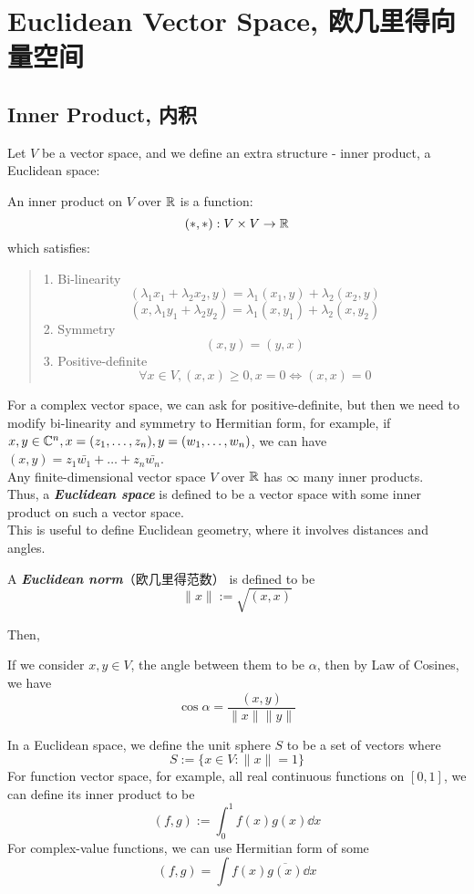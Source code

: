 \section{Euclidean Vector Space, 欧几里得向量空间}
\subsection{Inner Product, 内积}
Let $V$ be a vector space, and we define an extra structure - inner product, a Euclidean space:
\begin{definition}
    An inner product on $V$ over $\mathbb{R}$ is a function:
    $$(*, *) : V \times V \to \mathbb{R}$$
    which satisfies:
    \begin{quote}
        1. Bi-linearity
        $$(\lambda_1x_1 + \lambda_2x_2, y) = \lambda_1(x_1, y) + \lambda_2(x_2, y)$$
        $$(x, \lambda_1y_1 + \lambda_2y_2) = \lambda_1(x, y_1) + \lambda_2(x, y_2)$$
        2. Symmetry
        $$(x, y) = (y, x)$$
        3. Positive-definite
        $$\forall x \in V, (x, x) \ge 0, x = 0 \iff (x, x) = 0$$
    \end{quote}
\end{definition}
For a complex vector space, we can ask for positive-definite, but then we need to modify bi-linearity and symmetry to Hermitian form, for example, if $x, y \in \mathbb{C}^n, x = (z_1,  \dots, z_n), y = (w_1, \dots, w_n)$, we can have $(x, y) = z_1 \bar{w_1} + \dots + z_n \bar{w_n}$. \\
Any finite-dimensional vector space $V$ over $\mathbb{R}$ has $\infty$ many inner products. \\
Thus, a \textbf{\textit{Euclidean space}} is defined to be a vector space with some inner product on such a vector space. \\
This is useful to define Euclidean geometry, where it involves distances and angles.
\begin{definition}
    A \textbf{\textit{Euclidean norm}}（欧几里得范数） is defined to be
    $$\|x\| := \sqrt{(x, x)}$$
\end{definition}
Then,
\begin{definition}
    If we consider $x, y \in V$, the angle between them to be $\alpha$, then by Law of Cosines, we have
    $$\cos{\alpha} = \frac{(x, y)}{\|x\|\|y\|}$$
\end{definition}
In a Euclidean space, we define the unit sphere $S$ to be a set of vectors where
$$S := \{x \in V: \|x\| = 1\}$$
For function vector space, for example, all real continuous functions on $[0, 1]$, we can define its inner product to be
$$(f, g) := \int_0^1 f(x)g(x) \dd x$$
For complex-value functions, we can use Hermitian form of some
$$(f, g) = \int f(x)\overline{g(x)} \dd x$$
